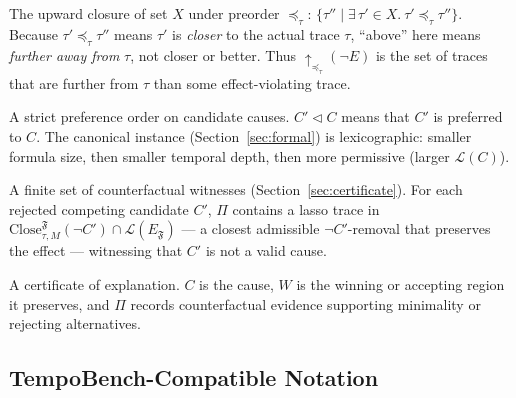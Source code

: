 \documentclass[11pt]{article}
\theoremstyle{remark}
\newcommand{\Close}{\mathrm{Close}}
\newcommand{\Lang}{\mathcal{L}}
\newcommand{\Frame}{\mathfrak{F}}
\begin{document}
\begin{description}[leftmargin=2.8cm,style=nextline]
  \item[\(\uparrow_{\preceq_\tau}(X)\)]
  The upward closure of set \(X\) under preorder \(\preceq_\tau\):
  \(\{\tau''\mid \exists\,\tau'\in X.\ \tau'\preceq_\tau\tau''\}\). Because
  \(\tau'\preceq_\tau\tau''\) means \(\tau'\) is \emph{closer} to the actual
  trace \(\tau\), ``above'' here means \emph{further away from} \(\tau\), not
  closer or better. Thus \(\uparrow_{\preceq_\tau}(\neg E)\) is the set of traces
  that are further from \(\tau\) than some effect-violating trace.

  \item[\(\triangleleft\)]
  A strict preference order on candidate causes. \(C'\triangleleft C\) means that
  \(C'\) is preferred to \(C\). The canonical instance
  (Section~\ref{sec:formal}) is lexicographic: smaller formula size, then smaller
  temporal depth, then more permissive (larger \(\Lang(C)\)).

  \item[\(\Pi\)]
  A finite set of counterfactual witnesses (Section~\ref{sec:certificate}). For
  each rejected competing candidate \(C'\), \(\Pi\) contains a lasso trace in
  \(\Close_{\tau,M}^{\Frame}(\neg C')\cap\Lang(E_{\Frame})\) --- a closest
  admissible \(\neg C'\)-removal that preserves the effect --- witnessing that
  \(C'\) is not a valid cause.

  \item[\((C,W,\Pi)\)]
  A certificate of explanation. \(C\) is the cause, \(W\) is the winning or
  accepting region it preserves, and \(\Pi\) records counterfactual evidence
  supporting minimality or rejecting alternatives.
\end{description}

\subsection*{TempoBench-Compatible Notation}
\end{document}
